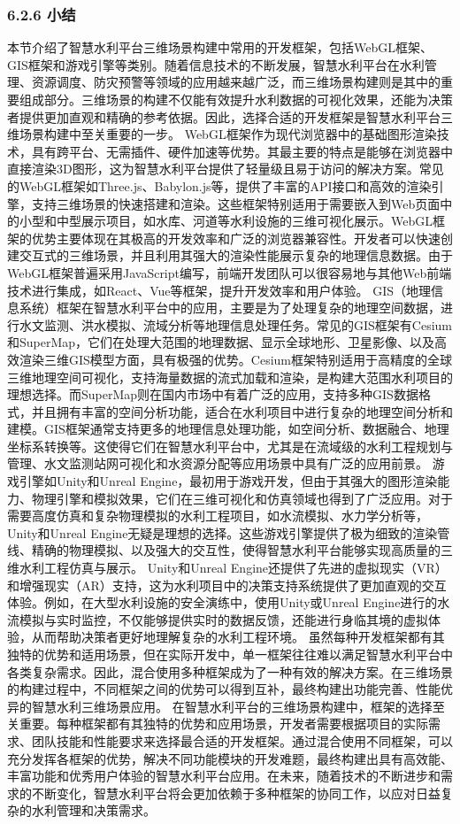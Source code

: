 {\subsubsection{6.2.6 小结}\label{ux5c0fux7ed3-1}
本节介绍了智慧水利平台三维场景构建中常用的开发框架，包括WebGL框架、GIS框架和游戏引擎等类别。随着信息技术的不断发展，智慧水利平台在水利管理、资源调度、防灾预警等领域的应用越来越广泛，而三维场景构建则是其中的重要组成部分。三维场景的构建不仅能有效提升水利数据的可视化效果，还能为决策者提供更加直观和精确的参考依据。因此，选择合适的开发框架是智慧水利平台三维场景构建中至关重要的一步。
WebGL框架作为现代浏览器中的基础图形渲染技术，具有跨平台、无需插件、硬件加速等优势。其最主要的特点是能够在浏览器中直接渲染3D图形，这为智慧水利平台提供了轻量级且易于访问的解决方案。常见的WebGL框架如Three.js、Babylon.js等，提供了丰富的API接口和高效的渲染引擎，支持三维场景的快速搭建和渲染。这些框架特别适用于需要嵌入到Web页面中的小型和中型展示项目，如水库、河道等水利设施的三维可视化展示。WebGL框架的优势主要体现在其极高的开发效率和广泛的浏览器兼容性。开发者可以快速创建交互式的三维场景，并且利用其强大的渲染性能展示复杂的地理信息数据。由于WebGL框架普遍采用JavaScript编写，前端开发团队可以很容易地与其他Web前端技术进行集成，如React、Vue等框架，提升开发效率和用户体验。
GIS（地理信息系统）框架在智慧水利平台中的应用，主要是为了处理复杂的地理空间数据，进行水文监测、洪水模拟、流域分析等地理信息处理任务。常见的GIS框架有Cesium和SuperMap，它们在处理大范围的地理数据、显示全球地形、卫星影像、以及高效渲染三维GIS模型方面，具有极强的优势。Cesium框架特别适用于高精度的全球三维地理空间可视化，支持海量数据的流式加载和渲染，是构建大范围水利项目的理想选择。而SuperMap则在国内市场中有着广泛的应用，支持多种GIS数据格式，并且拥有丰富的空间分析功能，适合在水利项目中进行复杂的地理空间分析和建模。GIS框架通常支持更多的地理信息处理功能，如空间分析、数据融合、地理坐标系转换等。这使得它们在智慧水利平台中，尤其是在流域级的水利工程规划与管理、水文监测站网可视化和水资源分配等应用场景中具有广泛的应用前景。
游戏引擎如Unity和Unreal
Engine，最初用于游戏开发，但由于其强大的图形渲染能力、物理引擎和模拟效果，它们在三维可视化和仿真领域也得到了广泛应用。对于需要高度仿真和复杂物理模拟的水利工程项目，如水流模拟、水力学分析等，Unity和Unreal
Engine无疑是理想的选择。这些游戏引擎提供了极为细致的渲染管线、精确的物理模拟、以及强大的交互性，使得智慧水利平台能够实现高质量的三维水利工程仿真与展示。 Unity和Unreal
Engine还提供了先进的虚拟现实（VR）和增强现实（AR）支持，这为水利项目中的决策支持系统提供了更加直观的交互体验。例如，在大型水利设施的安全演练中，使用Unity或Unreal
Engine进行的水流模拟与实时监控，不仅能够提供实时的数据反馈，还能进行身临其境的虚拟体验，从而帮助决策者更好地理解复杂的水利工程环境。
虽然每种开发框架都有其独特的优势和适用场景，但在实际开发中，单一框架往往难以满足智慧水利平台中各类复杂需求。因此，混合使用多种框架成为了一种有效的解决方案。在三维场景的构建过程中，不同框架之间的优势可以得到互补，最终构建出功能完善、性能优异的智慧水利三维场景应用。
在智慧水利平台的三维场景构建中，框架的选择至关重要。每种框架都有其独特的优势和应用场景，开发者需要根据项目的实际需求、团队技能和性能要求来选择最合适的开发框架。通过混合使用不同框架，可以充分发挥各框架的优势，解决不同功能模块的开发难题，最终构建出具有高效能、丰富功能和优秀用户体验的智慧水利平台应用。在未来，随着技术的不断进步和需求的不断变化，智慧水利平台将会更加依赖于多种框架的协同工作，以应对日益复杂的水利管理和决策需求。
}
